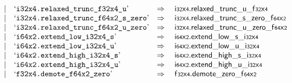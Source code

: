 $$\begin{array}[t]{@{}lrrl@{}l@{}l@{}l@{}}
& & | & \mbox{‘\texttt{i32x4.relaxed\_trunc\_f32x4\_u}’} & \quad\Rightarrow\quad{} & {\mathsf{i{\scriptstyle 32}}}{\mathsf{x}}{\mathsf{{\scriptstyle 4}}} {.} {{\mathsf{relaxed\_trunc}}{\mathsf{\_}}{\mathsf{u}}}{\mathsf{\_}}{{\mathsf{f{\scriptstyle 32}}}{\mathsf{x}}{\mathsf{{\scriptstyle 4}}}} \\
& & | & \mbox{‘\texttt{i32x4.relaxed\_trunc\_f64x2\_s\_zero}’} & \quad\Rightarrow\quad{} & {\mathsf{i{\scriptstyle 32}}}{\mathsf{x}}{\mathsf{{\scriptstyle 4}}} {.} {{\mathsf{relaxed\_trunc}}{\mathsf{\_}}{\mathsf{s}}{\mathsf{\_}}{\mathsf{zero}}}{\mathsf{\_}}{{\mathsf{f{\scriptstyle 64}}}{\mathsf{x}}{\mathsf{{\scriptstyle 2}}}} \\
& & | & \mbox{‘\texttt{i32x4.relaxed\_trunc\_f64x2\_u\_zero}’} & \quad\Rightarrow\quad{} & {\mathsf{i{\scriptstyle 32}}}{\mathsf{x}}{\mathsf{{\scriptstyle 4}}} {.} {{\mathsf{relaxed\_trunc}}{\mathsf{\_}}{\mathsf{u}}{\mathsf{\_}}{\mathsf{zero}}}{\mathsf{\_}}{{\mathsf{f{\scriptstyle 64}}}{\mathsf{x}}{\mathsf{{\scriptstyle 2}}}} \\
& & | & \mbox{‘\texttt{i64x2.extend\_low\_i32x4\_s}’} & \quad\Rightarrow\quad{} & {\mathsf{i{\scriptstyle 64}}}{\mathsf{x}}{\mathsf{{\scriptstyle 2}}} {.} {{\mathsf{extend}}{\mathsf{\_}}{\mathsf{low}}{\mathsf{\_}}{\mathsf{s}}}{\mathsf{\_}}{{\mathsf{i{\scriptstyle 32}}}{\mathsf{x}}{\mathsf{{\scriptstyle 4}}}} \\
& & | & \mbox{‘\texttt{i64x2.extend\_low\_i32x4\_u}’} & \quad\Rightarrow\quad{} & {\mathsf{i{\scriptstyle 64}}}{\mathsf{x}}{\mathsf{{\scriptstyle 2}}} {.} {{\mathsf{extend}}{\mathsf{\_}}{\mathsf{low}}{\mathsf{\_}}{\mathsf{u}}}{\mathsf{\_}}{{\mathsf{i{\scriptstyle 32}}}{\mathsf{x}}{\mathsf{{\scriptstyle 4}}}} \\
& & | & \mbox{‘\texttt{i64x2.extend\_high\_i32x4\_s}’} & \quad\Rightarrow\quad{} & {\mathsf{i{\scriptstyle 64}}}{\mathsf{x}}{\mathsf{{\scriptstyle 2}}} {.} {{\mathsf{extend}}{\mathsf{\_}}{\mathsf{high}}{\mathsf{\_}}{\mathsf{s}}}{\mathsf{\_}}{{\mathsf{i{\scriptstyle 32}}}{\mathsf{x}}{\mathsf{{\scriptstyle 4}}}} \\
& & | & \mbox{‘\texttt{i64x2.extend\_high\_i32x4\_u}’} & \quad\Rightarrow\quad{} & {\mathsf{i{\scriptstyle 64}}}{\mathsf{x}}{\mathsf{{\scriptstyle 2}}} {.} {{\mathsf{extend}}{\mathsf{\_}}{\mathsf{high}}{\mathsf{\_}}{\mathsf{u}}}{\mathsf{\_}}{{\mathsf{i{\scriptstyle 32}}}{\mathsf{x}}{\mathsf{{\scriptstyle 4}}}} \\
& & | & \mbox{‘\texttt{f32x4.demote\_f64x2\_zero}’} & \quad\Rightarrow\quad{} & {\mathsf{f{\scriptstyle 32}}}{\mathsf{x}}{\mathsf{{\scriptstyle 4}}} {.} {{\mathsf{demote}}{\mathsf{\_}}{\mathsf{zero}}}{\mathsf{\_}}{{\mathsf{f{\scriptstyle 64}}}{\mathsf{x}}{\mathsf{{\scriptstyle 2}}}} \\

\end{array}$$

